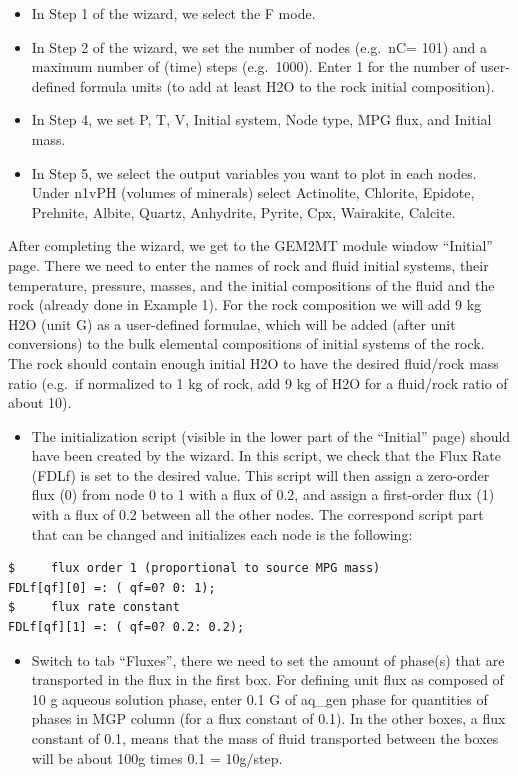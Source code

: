 \documentclass[
]{book}
\providecommand{\tightlist}{%
  \setlength{\itemsep}{0pt}\setlength{\parskip}{0pt}}
\begin{document}
\begin{itemize}
\item
  In Step 1 of the wizard, we select the F mode.
\item
  In Step 2 of the wizard, we set the number of nodes (e.g.~nC= 101) and a maximum number of (time) steps (e.g.~1000). Enter 1 for the number of user-defined formula units (to add at least H2O to the rock initial composition).
\item
  In Step 4, we set P, T, V, Initial system, Node type, MPG flux, and Initial mass.
\item
  In Step 5, we select the output variables you want to plot in each nodes. Under n1vPH (volumes of minerals) select Actinolite, Chlorite, Epidote, Prehnite, Albite, Quartz, Anhydrite, Pyrite, Cpx, Wairakite, Calcite.
\end{itemize}

After completing the wizard, we get to the GEM2MT module window ``Initial'' page. There we need to enter the names of rock and fluid initial systems, their temperature, pressure, masses, and the initial compositions of the fluid and the rock (already done in Example 1). For the rock composition we will add 9 kg H2O (unit G) as a user-defined formulae, which will be added (after unit conversions) to the bulk elemental compositions of initial systems of the rock. The rock should contain enough initial H2O to have the desired fluid/rock mass ratio (e.g.~if normalized to 1 kg of rock, add 9 kg of H2O for a fluid/rock ratio of about 10).

\begin{itemize}
\tightlist
\item
  The initialization script (visible in the lower part of the ``Initial'' page) should have been created by the wizard. In this script, we check that the Flux Rate (FDLf) is set to the desired value. This script will then assign a zero-order flux (0) from node 0 to 1 with a flux of 0.2, and assign a first-order flux (1) with a flux of 0.2 between all the other nodes. The correspond script part that can be changed and initializes each node is the following:
\end{itemize}

\begin{verbatim}
$     flux order 1 (proportional to source MPG mass)
FDLf[qf][0] =: ( qf=0? 0: 1);
$     flux rate constant
FDLf[qf][1] =: ( qf=0? 0.2: 0.2);
\end{verbatim}

\begin{itemize}
\tightlist
\item
  Switch to tab ``Fluxes'', there we need to set the amount of phase(s) that are transported in the flux in the first box. For defining unit flux as composed of 10 g aqueous solution phase, enter 0.1 G of aq\_gen phase for quantities of phases in MGP column (for a flux constant of 0.1). In the other boxes, a flux constant of 0.1, means that the mass of fluid transported between the boxes will be about 100g times 0.1 = 10g/step.
\end{itemize}
\end{document}
